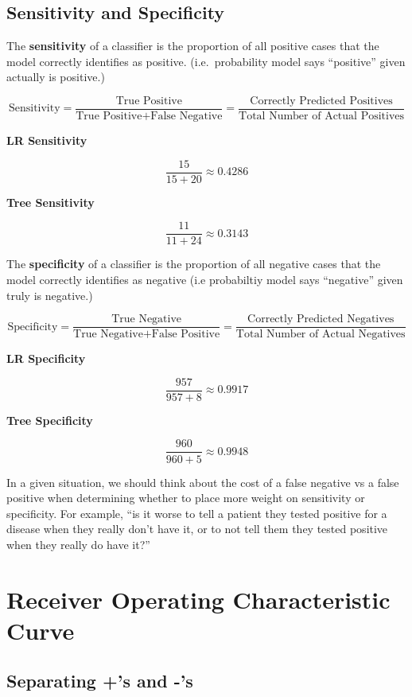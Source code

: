 \documentclass[
  letterpaper,
  DIV=11,
  numbers=noendperiod]{scrreprt}
\begin{document}
\subsection{Sensitivity and
Specificity}\label{sensitivity-and-specificity}

The \textbf{sensitivity} of a classifier is the proportion of all
positive cases that the model correctly identifies as positive.
(i.e.~probability model says ``positive'' given actually is positive.)

\[
\text{Sensitivity} = \frac{\text{True Positive}}{\text{True Positive} + \text{False Negative}} = \frac{\text{Correctly Predicted Positives}}{\text{Total Number of Actual Positives}}
\]

\textbf{LR Sensitivity}

\[
\frac{15}{15+20} \approx 0.4286
\]

\textbf{Tree Sensitivity}

\[
\frac{11}{11+24} \approx 0.3143
\]

The \textbf{specificity} of a classifier is the proportion of all
negative cases that the model correctly identifies as negative (i.e
probabiltiy model says ``negative'' given truly is negative.)

\[\text{Specificity} = \frac{\text{True Negative}}{\text{True Negative} + \text{False Positive}}= \frac{\text{Correctly Predicted Negatives}}{\text{Total Number of Actual Negatives}}
\]

\textbf{LR Specificity}

\[\frac{957}{957+8} \approx 0.9917\]

\textbf{Tree Specificity}

\[\frac{960}{960+5} \approx 0.9948 \]

In a given situation, we should think about the cost of a false negative
vs a false positive when determining whether to place more weight on
sensitivity or specificity. For example, ``is it worse to tell a patient
they tested positive for a disease when they really don't have it, or to
not tell them they tested positive when they really do have it?''

\section{Receiver Operating Characteristic
Curve}\label{receiver-operating-characteristic-curve}

\subsection{Separating +'s and -'s}\label{separating-s-and--s}
\end{document}

